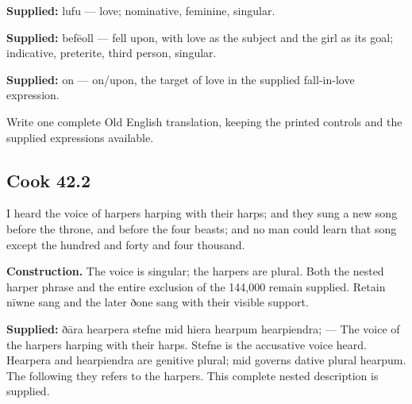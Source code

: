 \textbf{Supplied:} lufu — love; nominative, feminine, singular.

\textbf{Supplied:} befēoll — fell upon, with love as the subject and the girl as its goal; indicative, preterite, third person, singular.

\textbf{Supplied:} on — on/\allowbreak{}upon, the target of love in the supplied fall-in-love expression.

Write one complete Old English translation, keeping the printed controls and the supplied expressions available.

\par\begin{minipage}{\linewidth}\raggedright
\subsection*{Cook 42.2}

I heard the voice of harpers harping with their harps; and they sung a new song before the throne, and before the four beasts; and no man could learn that song except the hundred and forty and four thousand.

\end{minipage}\par\addvspace{4pt}

\textbf{Construction.} The voice is singular; the harpers are plural. Both the nested harper phrase and the entire exclusion of the 144,000 remain supplied. Retain nīwne sang and the later ðone sang with their visible support.

\textbf{Supplied:} ðāra hearpera stefne mid hiera hearpum hearpiendra; — The voice of the harpers harping with their harps. Stefne is the accusative voice heard. Hearpera and hearpiendra are genitive plural; mid governs dative plural hearpum. The following they refers to the harpers. This complete nested description is supplied.


